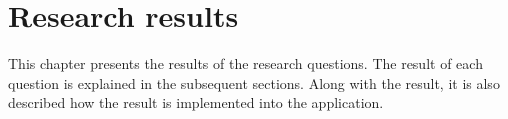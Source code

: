 \chapter{Research results}

This chapter presents the results of the research questions. The result of each question is explained in the subsequent sections. Along with the result, it is also described how the result is implemented into the application. 



